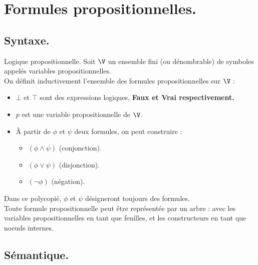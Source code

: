 \documentclass[french, 11pt]{article}
\begin{document}


\section{Formules propositionnelles.}
\subsection{Syntaxe.}

\begin{defi}{Logique propositionnelle.}{}
    Soit $\V$ un ensemble fini (ou dénombrable) de symboles appelés variables propositionnelles.\\
    On définit inductivement l'ensemble des formules propositionnelles sur $\V$ :
    \begin{itemize}
        \item $\bot$ et $\top$ sont des expressions logiques, \bf{Faux} et \bf{Vrai} respectivement.
        \item $p$ est une variable propositionnelle de $\V$.
        \item À partir de $\phi$ et $\psi$ deux formules, on peut construire : 
        \begin{itemize}[label=$\hra$]
            \item $(\phi \land \psi)$ (conjonction).
            \item $(\phi \lor \psi)$ (disjonction).
            \item $(\lnot\phi)$ (négation).
        \end{itemize}
    \end{itemize}
    Dans ce polycopié, $\phi$ et $\psi$ désigneront toujours des formules.\\
    Toute formule propositionnelle peut être représentée par un arbre : avec les variables propositionnelles en tant que feuilles, et les constructeurs en tant que noeuds internes.
\end{defi}

\vspace*{-0.5cm}

\subsection{Sémantique.}
\end{document}
